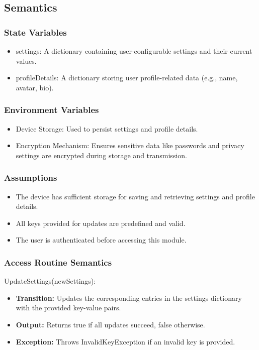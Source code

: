 \documentclass[12pt, titlepage]{article}
\begin{document}
\subsection{Semantics}

\subsubsection{State Variables}

\begin{itemize}
  \item settings: A dictionary containing user-configurable settings and their current values.
  \item profileDetails: A dictionary storing user profile-related data (e.g., name, avatar, bio).
\end{itemize}

\subsubsection{Environment Variables}

\begin{itemize}
  \item Device Storage: Used to persist settings and profile details.
  \item Encryption Mechanism: Ensures sensitive data like passwords and privacy settings are encrypted during storage and transmission.
\end{itemize}

\subsubsection{Assumptions}

\begin{itemize}
  \item The device has sufficient storage for saving and retrieving settings and profile details.
  \item All keys provided for updates are predefined and valid.
  \item The user is authenticated before accessing this module.
\end{itemize}

\subsubsection{Access Routine Semantics}

\noindent UpdateSettings(newSettings):
\begin{itemize}
  \item \textbf{Transition:} Updates the corresponding entries in the settings dictionary with the provided key-value pairs.
  \item \textbf{Output:} Returns true if all updates succeed, false otherwise.
  \item \textbf{Exception:} Throws InvalidKeyException if an invalid key is provided.
\end{itemize}
\end{document}
